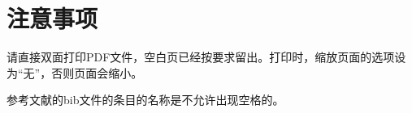 ﻿%

\chapter{注意事项}
\label{chap03}

请直接双面打印PDF文件，空白页已经按要求留出。打印时，缩放页面的选项设
为“无”，否则页面会缩小。

参考文献的bib文件的条目的名称是不允许出现空格的。